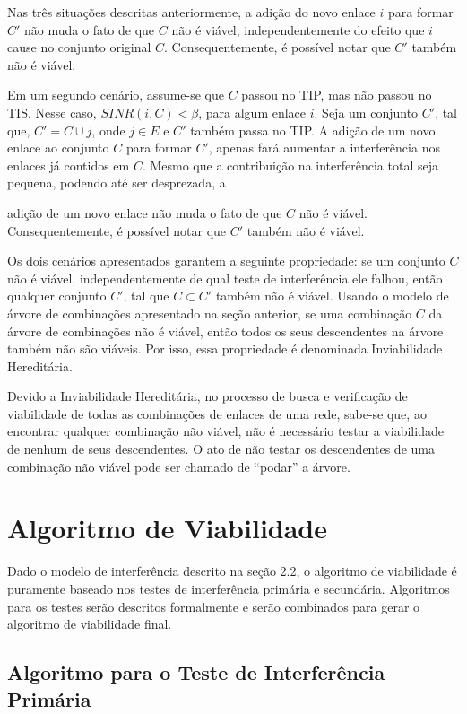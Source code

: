 Nas três situações descritas anteriormente, a adição do novo enlace $i$ para formar $C'$ não muda o fato de que $C$ não é viável, independentemente do efeito que $i$ cause no conjunto original $C$. Consequentemente, é possível notar que $C'$ também não é viável.

Em um segundo cenário, assume-se que $C$ passou no TIP, mas não passou no TIS. Nesse caso, $SINR(i,C) < \beta$, para algum enlace $i$. Seja um conjunto $C'$, tal que, $C' = C \cup {j}$, onde $j \in E$ e $C'$ também passa no TIP. A adição de um novo enlace ao conjunto $C$ para formar $C'$, apenas fará aumentar a interferência nos enlaces já contidos em $C$. Mesmo que a contribuição na interferência total seja pequena, podendo até ser desprezada, a 


adição de um novo enlace não muda o fato de que $C$ não é viável. Consequentemente, é possível notar que $C'$ também não é viável.

Os dois cenários apresentados garantem a seguinte propriedade: se um conjunto $C$ não é viável, independentemente de qual teste de interferência ele falhou, então qualquer conjunto $C'$, tal que $C \subset C'$ também não é viável. Usando o modelo de árvore de combinações apresentado na seção anterior, se uma combinação $C$ da árvore de combinações não é viável, então todos os seus descendentes na árvore também não são viáveis. Por isso, essa propriedade é denominada Inviabilidade Hereditária. 

Devido a Inviabilidade Hereditária, no processo de busca e verificação de viabilidade de todas as combinações de enlaces de uma rede, sabe-se que, ao encontrar qualquer combinação não viável, não é necessário testar a viabilidade de nenhum de seus descendentes. O ato de não testar os descendentes de uma combinação não viável pode ser chamado de ``podar'' a árvore.

\section{Algoritmo de Viabilidade}

Dado o modelo de interferência descrito na seção 2.2, o algoritmo de viabilidade  é puramente baseado nos testes de interferência primária e secundária. Algoritmos para os testes serão descritos formalmente e serão combinados para gerar o algoritmo de viabilidade final. 

\subsection{Algoritmo para o Teste de Interferência Primária}

